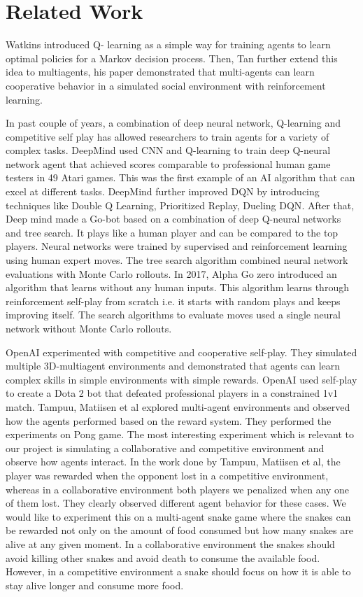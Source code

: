 \documentclass[conference,10pt]{IEEEtran}
\begin{document}
	\section{Related Work}
	Watkins\cite{sp1} introduced Q- learning as a simple way for training agents to learn
	optimal policies for a Markov decision process. Then, Tan\cite{sp2} further extend
	this idea to multiagents, his paper demonstrated that
	multi-agents can learn cooperative behavior in a simulated social environment with reinforcement learning.

	In past couple of years, a combination of deep neural network, Q-learning and
	competitive self play has allowed researchers to train agents for a variety
	of complex tasks. DeepMind\cite{sp3} used CNN and Q-learning to train deep Q-neural
	network agent that achieved scores comparable to professional human game
	testers in 49 Atari games. This was the first example of an AI algorithm
	that can excel at different tasks. DeepMind further improved DQN by introducing
	techniques like Double Q Learning\cite{sp4}, Prioritized Replay\cite{sp5}, Dueling DQN\cite{sp6}.  After
	that, Deep mind made a Go-bot\cite{sp7} based on a combination of deep Q-neural
	networks and tree search. It plays like a human player and can be compared to the top players. Neural networks were trained by supervised and reinforcement learning using human
	expert moves. The tree search algorithm
	combined neural network evaluations with Monte Carlo rollouts. In 2017, Alpha
	Go zero\cite{sp8} introduced an algorithm that learns without any human inputs.
	This algorithm learns through reinforcement self-play from scratch i.e. it starts
	with random plays and keeps improving itself. The search algorithms to evaluate moves used a single
	neural network without Monte Carlo rollouts.

	OpenAI experimented with competitive and cooperative self-play\cite{sp9}. They simulated
	multiple 3D-multiagent environments and demonstrated that agents can learn
	complex skills in simple environments with simple rewards. OpenAI\cite{sp10} used
	self-play to create a Dota 2 bot that defeated professional players in a
	constrained 1v1 match.
	\break
	\break
	Tampuu, Matiisen et al\cite{sd7} explored multi-agent environments and observed how the agents performed based on the reward system. They performed the experiments on Pong game. The most interesting experiment which is relevant to our project is simulating a collaborative and competitive environment and observe how agents interact. In the work done by Tampuu, Matiisen et al\cite{sd3}, the player was rewarded when the opponent lost in a competitive environment, whereas in a collaborative environment both players we penalized when any one of them lost. They clearly observed different agent behavior for these cases.
	\break
	\break
	We would like to experiment this on a multi-agent snake game where the snakes can be rewarded not only on the amount of food consumed but how many snakes are alive at any given moment. In a collaborative environment the snakes should avoid killing other snakes and avoid death to consume the available food. However, in a competitive environment a snake should focus on how it is able to stay alive longer and consume more food.
\end{document}
